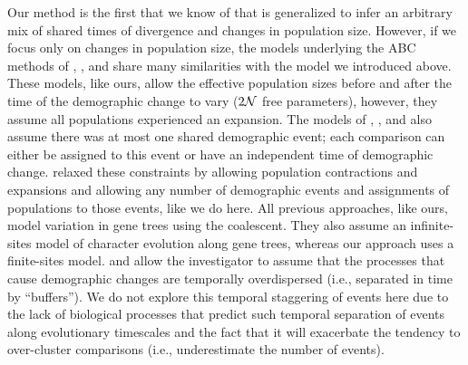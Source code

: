 Our method is the first that we know of that is generalized to infer an
arbitrary mix of shared times of divergence and changes in population size.
However, if we focus only on changes in population size, the models underlying
the ABC methods of
\citet{Chan2014}, \citet{Xue2015}, and \citet{Gehara2017}
share many similarities with the model we introduced above.
These models, like ours, allow the effective population sizes before and after
the time of the demographic change to vary ($2\mathcal{N}$ free parameters),
however, they assume all populations experienced an expansion.
The models of \citet{Chan2014}, \citet{Xue2015}, and \citet{Gehara2017}
also assume there was at most one shared demographic event;
each comparison can either be assigned to this event or have an independent
time of demographic change.
\citet{Xue2017} relaxed these constraints by allowing population contractions
and expansions and allowing any number of demographic events and assignments of
populations to those events, like we do here.
All previous approaches, like ours, model variation in gene trees using the
coalescent.
They also assume an infinite-sites model of character evolution along gene
trees, whereas our approach uses a finite-sites model.
\citet{Gehara2017} and \citet{Xue2017}
allow the investigator to assume that the processes that cause demographic
changes are temporally overdispersed (i.e., separated in time by ``buffers'').
We do not explore this temporal staggering of events here due to the lack of
biological processes that predict such temporal separation of events along
evolutionary timescales and the fact that it will exacerbate the tendency to
over-cluster comparisons
(i.e., underestimate the number of events).


